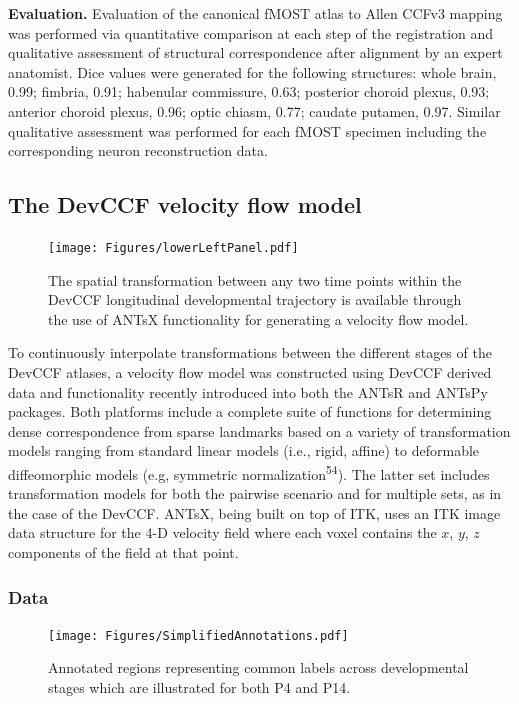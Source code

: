 \documentclass[
  12pt,
]{article}
\begin{document}
\textbf{Evaluation.} Evaluation of the canonical fMOST atlas to Allen
CCFv3 mapping was performed via quantitative comparison at each step of
the registration and qualitative assessment of structural correspondence
after alignment by an expert anatomist. Dice values were generated for
the following structures: whole brain, 0.99; fimbria, 0.91; habenular
commissure, 0.63; posterior choroid plexus, 0.93; anterior choroid
plexus, 0.96; optic chiasm, 0.77; caudate putamen, 0.97. Similar
qualitative assessment was performed for each fMOST specimen including
the corresponding neuron reconstruction data.

\subsection{The DevCCF velocity flow
model}\label{the-devccf-velocity-flow-model-1}

\begin{figure}
\centering
\texttt{[image: Figures/lowerLeftPanel.pdf]}
\caption{The spatial transformation between any two time points within the
DevCCF longitudinal developmental trajectory is available through the use of
ANTsX functionality for generating a velocity flow model.}
\label{fig:devccfvelocity}
\end{figure}

To continuously interpolate transformations between the different stages
of the DevCCF atlases, a velocity flow model was constructed using
DevCCF derived data and functionality recently introduced into both the
ANTsR and ANTsPy packages. Both platforms include a complete suite of
functions for determining dense correspondence from sparse landmarks
based on a variety of transformation models ranging from standard linear
models (i.e., rigid, affine) to deformable diffeomorphic models (e.g,
symmetric normalization\textsuperscript{54}). The latter set includes
transformation models for both the pairwise scenario and for multiple
sets, as in the case of the DevCCF. ANTsX, being built on top of ITK,
uses an ITK image data structure for the 4-D velocity field where each
voxel contains the \(x\), \(y\), \(z\) components of the field at that
point.

\subsubsection{Data}\label{data}

\begin{figure}[!htb]
\centering
\texttt{[image: Figures/SimplifiedAnnotations.pdf]}
\caption{Annotated regions representing common labels across developmental stages which
are illustrated for both P4 and P14.}
\label{fig:simplifiedannotations}
\end{figure}
\end{document}
